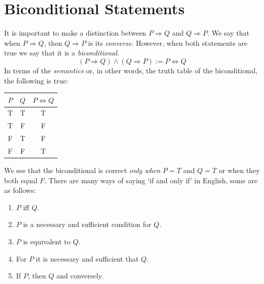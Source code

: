 \section{Biconditional Statements}
It is important to make a distinction between $P\Rightarrow Q$ and $Q\Rightarrow P$. We say that when $P\Rightarrow Q$, then $Q\Rightarrow P$ is its \emph{converse}. However, when both statements are true we say that it is a \emph{biconditional}. 
$$
(P\Rightarrow Q)\land(Q\Rightarrow P) := P \Leftrightarrow Q
$$
In terms of the \emph{semantics} or, in other words, the truth table of the biconditional, the following is true: 
\begin{table}[H]
    \centering
    \begin{tabular}{ccc}
        \toprule
        $P$ & $Q$ & $P\Leftrightarrow Q$\\
        \midrule
        T & T & T\\
        
        T & F & F \\
        
        F & T & F \\
        
        F & F & T\\
        \bottomrule
    \end{tabular}
\end{table}
We see that the biconditional is correct \emph{only when} $P=T$ and $Q=T$ or when they both equal $F$.\newline
There are many ways of saying `if and only if' in English, some are as follows: 
\begin{enumerate}
    \item $P$ iff $Q$.
    \item $P$ is a necessary and sufficient condition for $Q$. 
    \item $P$ is equivalent to $Q$.
    \item For $P$ it is necessary and sufficient that $Q$. 
    \item If $P$, then $Q$ and conversely. 
\end{enumerate}


